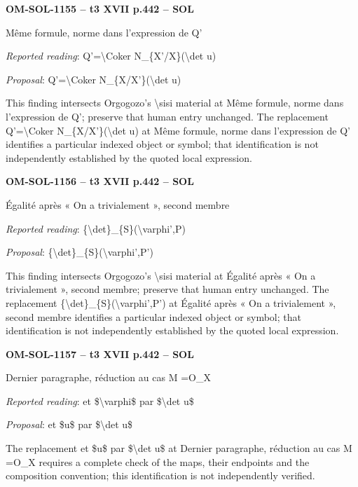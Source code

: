 \par\noindent\textbf{OM-SOL-1155 -- t3 XVII p.442 -- SOL}\par
Même formule, norme dans l'expression de Q'\par
\emph{Reported reading}: Q'=\allowbreak \textbackslash{}Coker N\_\{X'/X\}(\textbackslash{}det u)\par
\emph{Proposal}: Q'=\allowbreak \textbackslash{}Coker N\_\{X/X'\}(\textbackslash{}det u)\par
This finding intersects Orgogozo's \textbackslash{}sisi material at Même formule, norme dans l'expression de Q'; preserve that human entry unchanged. The replacement Q'=\allowbreak \textbackslash{}Coker N\_\{X/X'\}(\textbackslash{}det u) at Même formule, norme dans l'expression de Q' identifies a particular indexed object or symbol; that identification is not independently established by the quoted local expression.\par
\par\noindent\textbf{OM-SOL-1156 -- t3 XVII p.442 -- SOL}\par
Égalité après « On a trivialement », second membre\par
\emph{Reported reading}: \{\textbackslash{}det\}\_\{S\}(\textbackslash{}varphi',P)\par
\emph{Proposal}: \{\textbackslash{}det\}\_\{S\}(\textbackslash{}varphi',P')\par
This finding intersects Orgogozo's \textbackslash{}sisi material at Égalité après « On a trivialement », second membre; preserve that human entry unchanged. The replacement \{\textbackslash{}det\}\_\{S\}(\textbackslash{}varphi',P') at Égalité après « On a trivialement », second membre identifies a particular indexed object or symbol; that identification is not independently established by the quoted local expression.\par
\par\noindent\textbf{OM-SOL-1157 -- t3 XVII p.442 -- SOL}\par
Dernier paragraphe, réduction au cas M =\allowbreak  O\_X\par
\emph{Reported reading}: et \$\textbackslash{}varphi\$ par \$\textbackslash{}det u\$\par
\emph{Proposal}: et \$u\$ par \$\textbackslash{}det u\$\par
The replacement et \$u\$ par \$\textbackslash{}det u\$ at Dernier paragraphe, réduction au cas M =\allowbreak  O\_X requires a complete check of the maps, their endpoints and the composition convention; this identification is not independently verified.\par
